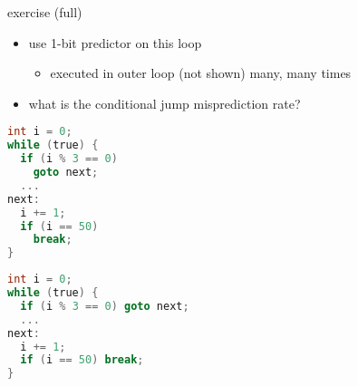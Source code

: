 \begin{frame}[fragile,label=1BmispredEx]{exercise (full)}
\begin{itemize}
\item use 1-bit predictor on this loop
    \begin{itemize}
    \item executed in outer loop (not shown) many, many times
    \end{itemize}
\item what is the conditional jump misprediction rate?
\end{itemize}
\begin{lstlisting}[language=C,style=small]
int i = 0;
while (true) {
  if (i % 3 == 0)
    goto next; 
  ...
next:
  i += 1;
  if (i == 50)
    break; 
}
\end{lstlisting}
\end{frame}

\ifdefined\exCode\else\newsavebox\exCode\fi
\begin{lrbox}{\exCode}
\begin{lstlisting}[language=C,style=smaller]
int i = 0;
while (true) {
  if (i % 3 == 0) goto next;
  ...
next:
  i += 1;
  if (i == 50) break;
}
\end{lstlisting}
\end{lrbox}


